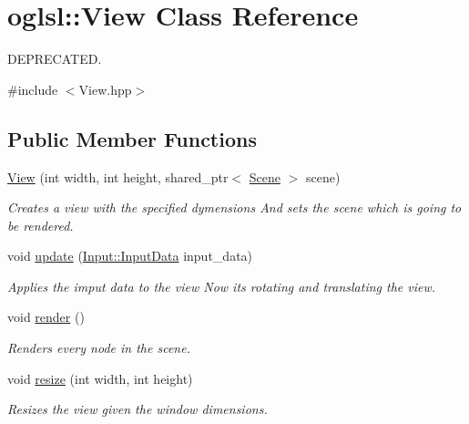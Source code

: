 \hypertarget{classoglsl_1_1_view}{}\section{oglsl\+:\+:View Class Reference}
\label{classoglsl_1_1_view}


D\+E\+P\+R\+E\+C\+A\+T\+ED.  




{\ttfamily \#include $<$View.\+hpp$>$}

\subsection*{Public Member Functions}
\begin{DoxyCompactItemize}
\item 
\mbox{\hyperlink{classoglsl_1_1_view_ae7f67b78cdd174449edc93960f29d9f4}{View}} (int width, int height, shared\+\_\+ptr$<$ \mbox{\hyperlink{classoglsl_1_1_scene}{Scene}} $>$ scene)
\begin{DoxyCompactList}\small\item\em Creates a view with the specified dymensions And sets the scene which is going to be rendered. \end{DoxyCompactList}\item 
void \mbox{\hyperlink{classoglsl_1_1_view_ac0b18fc4d2abe1abca6940c55313ef3b}{update}} (\mbox{\hyperlink{classoglsl_1_1_input_a3b21d7328538e661f366af5d6059c197}{Input\+::\+Input\+Data}} input\+\_\+data)
\begin{DoxyCompactList}\small\item\em Applies the imput data to the view Now it\textquotesingle{}s rotating and translating the view. \end{DoxyCompactList}\item 
void \mbox{\hyperlink{classoglsl_1_1_view_a10ea89fc705a2ba2252f673499524bf2}{render}} ()
\begin{DoxyCompactList}\small\item\em Renders every node in the scene. \end{DoxyCompactList}\item 
void \mbox{\hyperlink{classoglsl_1_1_view_a2396337a1db393acefb174e386cde7d1}{resize}} (int width, int height)
\begin{DoxyCompactList}\small\item\em Resizes the view given the window dimensions. \end{DoxyCompactList}\end{DoxyCompactItemize}



